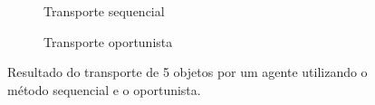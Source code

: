 \begin{figure}[h]
  \centering
  \setlength{\fboxsep}{0pt}

  \begin{subfigure}[t]{0.45\textwidth}
    \centering
    \caption{Transporte sequencial}
    \label{fig:figure_simple}
  \end{subfigure}
  \hspace{0.2cm}
  \begin{subfigure}[t]{0.45\textwidth}
    \centering
    \caption{Transporte oportunista}
    \label{fig:figure_smart}
  \end{subfigure}

  \caption[Resultado do transporte de 3 objetos por um agente]{Resultado do transporte de 5 objetos por um agente utilizando o método sequencial e o oportunista.}
  \label{fig:figure_simple_smart}

\end{figure}

